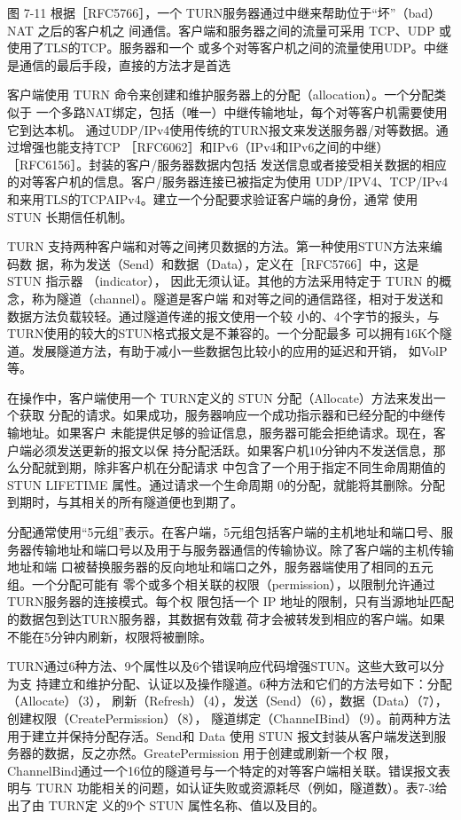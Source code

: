图 7-11
根据［RFC5766］，一个 TURN服务器通过中继来帮助位于“坏”（bad） NAT 之后的客户机之
间通信。客户端和服务器之间的流量可采用 TCP、UDP 或使用了TLS的TCP。服务器和一个
或多个对等客户机之间的流量使用UDP。中继是通信的最后手段，直接的方法才是首选

客户端使用 TURN 命令来创建和维护服务器上的分配（allocation）。一个分配类似于
一个多路NAT绑定，包括（唯一）中继传输地址，每个对等客户机需要使用它到达本机。
通过UDP/IPv4使用传统的TURN报文来发送服务器/对等数据。通过增强也能支持TCP
［RFC6062］和IPv6（IPv4和IPv6之间的中继）［RFC6156］。封装的客户/服务器数据内包括
发送信息或者接受相关数据的相应的对等客户机的信息。客户/服务器连接已被指定为使用
UDP/IPV4、TCP/IPv4 和来用TLS的TCPAIPv4。建立一个分配要求验证客户端的身份，通常
使用 STUN 长期信任机制。

TURN 支持两种客户端和对等之间拷贝数据的方法。第一种使用STUN方法来编码数
据，称为发送（Send）和数据（Data），定义在［RFC5766］中，这是 STUN 指示器 （indicator），
因此无须认证。其他的方法采用特定于 TURN 的概念，称为隧道（channel）。隧道是客户端
和对等之间的通信路径，相对于发送和数据方法负载较轻。通过隧道传递的报文使用一个较
小的、4个字节的报头，与TURN使用的较大的STUN格式报文是不兼容的。一个分配最多
可以拥有16K个隧道。发展隧道方法，有助于减小一些数据包比较小的应用的延迟和开销，
如VolP等。

在操作中，客户端使用一个 TURN定义的 STUN 分配（Allocate）方法来发出一个获取
分配的请求。如果成功，服务器响应一个成功指示器和已经分配的中继传输地址。如果客户
未能提供足够的验证信息，服务器可能会拒绝请求。现在，客户端必须发送更新的报文以保
持分配活跃。如果客户机10分钟内不发送信息，那么分配就到期，除非客户机在分配请求
中包含了一个用于指定不同生命周期值的 STUN LIFETIME 属性。通过请求一个生命周期
0的分配，就能将其删除。分配到期时，与其相关的所有隧道便也到期了。

分配通常使用“5元组”表示。在客户端，5元组包括客户端的主机地址和端口号、服
务器传输地址和端口号以及用于与服务器通信的传输协议。除了客户端的主机传输地址和端
口被替换服务器的反向地址和端口之外，服务器端使用了相同的五元组。一个分配可能有
零个或多个相关联的权限（permission），以限制允许通过TURN服务器的连接模式。每个权
限包括一个 IP 地址的限制，只有当源地址匹配的数据包到达TURN服务器，其数据有效载
荷才会被转发到相应的客户端。如果不能在5分钟内刷新，权限将被删除。

TURN通过6种方法、9个属性以及6个错误响应代码增强STUN。这些大致可以分为支
持建立和维护分配、认证以及操作隧道。6种方法和它们的方法号如下：分配（Allocate）（3），
刷新（Refresh）（4），发送（Send）（6），数据（Data）（7），创建权限（CreatePermission）（8），
隧道绑定（ChanneIBind）（9）。前两种方法用于建立并保持分配存活。Send和 Data 使用 STUN
报文封装从客户端发送到服务器的数据，反之亦然。GreatePermission 用于创建或刷新一个权
限，ChannelBind通过一个16位的隧道号与一个特定的对等客户端相关联。错误报文表明与
TURN 功能相关的问题，如认证失败或资源耗尽（例如，隧道数）。表7-3给出了由 TURN定
义的9个 STUN 属性名称、值以及目的。

